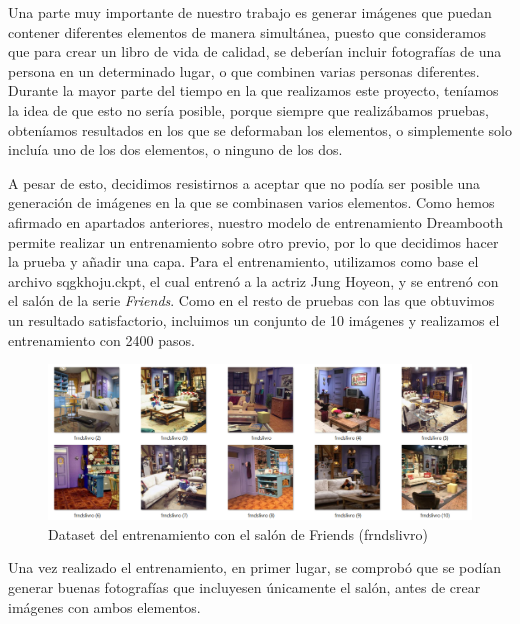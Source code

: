 Una parte muy importante de nuestro trabajo es generar imágenes que puedan contener diferentes elementos de manera simultánea, puesto que consideramos que para crear un libro de vida de calidad, se deberían incluir fotografías de una persona en un determinado lugar, o que combinen varias personas diferentes. Durante la mayor parte del tiempo en la que realizamos este proyecto, teníamos la idea de que esto no sería posible, porque siempre que realizábamos pruebas, obteníamos resultados en los que se deformaban los elementos, o simplemente solo incluía uno de los dos elementos, o ninguno de los dos. 

A pesar de esto, decidimos resistirnos a aceptar que no podía ser posible una generación de imágenes en la que se combinasen varios elementos. Como hemos afirmado en apartados anteriores, nuestro modelo de entrenamiento Dreambooth permite realizar un entrenamiento sobre otro previo, por lo que decidimos hacer la prueba y añadir una capa. Para el entrenamiento, utilizamos como base el archivo sqgkhoju.ckpt, el cual entrenó a la actriz Jung Hoyeon, y se entrenó con el salón de la serie \textit{Friends}. Como en el resto de pruebas con las que obtuvimos un resultado satisfactorio, incluimos un conjunto de 10 imágenes y realizamos el entrenamiento con 2400 pasos.\\

\begin{figure}[!htb]
	\centering
	\includegraphics[width = 1
	\textwidth]{Imagenes/Vectorial/dataset_frdslivro.png}
	\caption{Dataset del entrenamiento con el salón de Friends (frndslivro)}
	\label{fig:dataset_frdslivro}
\end{figure}


Una vez realizado el entrenamiento, en primer lugar, se comprobó que se podían generar buenas fotografías que incluyesen únicamente el salón, antes de crear imágenes con ambos elementos.\\

